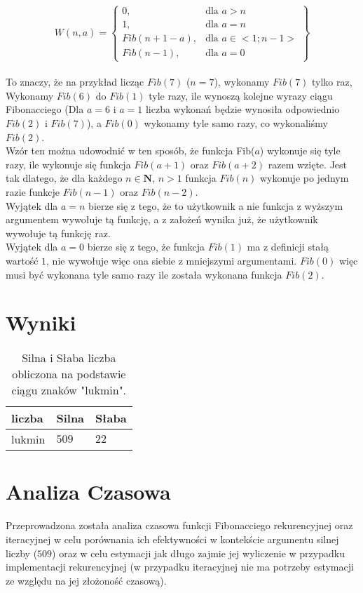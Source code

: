 \documentclass{article}
\begin{document}
\[
W(n, a) = \left\{\begin{array}{lr}
    0, & \text{dla } a > n\\
    1, & \text{dla } a = n\\
    Fib(n + 1 - a), & \text{dla } a \in <1; n-1>\\
    Fib(n - 1), & \text{dla } a = 0
    \end{array}\right\}
\]\\
To znaczy, że na przykład licząc $Fib(7)$ ($n = 7$), wykonamy $Fib(7)$ tylko raz, Wykonamy $Fib(6)$ do $Fib(1)$ tyle razy, ile wynoszą kolejne wyrazy ciągu Fibonacciego (Dla $a = 6$ i $a = 1$ liczba wykonań będzie wynosiła odpowiednio $Fib(2)$ i $Fib(7)$), a $Fib(0)$ wykonamy tyle samo razy, co wykonaliśmy $Fib(2)$.\vspace{2ex}\\

Wzór ten można udowodnić w ten sposób, że funkcja Fib($a$) wykonuje się tyle razy, ile wykonuje się funkcja $Fib(a+1)$ oraz $Fib(a+2)$ razem wzięte. Jest tak dlatego, że dla każdego $n \in \mathbf{N}$, $n > 1$ funkcja $Fib(n)$ wykonuje po jednym razie funkcje $Fib(n-1)$ oraz $Fib(n-2)$.\vspace{1ex}\\
Wyjątek dla $a = n$ bierze się z tego, że to użytkownik a nie funkcja z wyższym argumentem wywołuje tą funkcję, a z założeń wynika już, że użytkownik wywołuje tą funkcję raz.\\
Wyjątek dla $a = 0$ bierze się z tego, że funkcja $Fib(1)$ ma z definicji stałą wartość $1$, nie wywołuje więc ona siebie z mniejszymi argumentami. $Fib(0)$ więc musi być wykonana tyle samo razy ile została wykonana funkcja $Fib(2)$.

\section{Wyniki}

\begin{table}[h]
\centering
\begin{tabular}{|l|l|l|}\hline
liczba & Silna & Słaba \\\hline
 lukmin & $509$ & $22$\\\hline
\end{tabular}
\caption{\label{tab:h2}Silna i Słaba liczba obliczona na podstawie ciągu znaków "lukmin".}
\end{table}

\section{Analiza Czasowa}
Przeprowadzona została analiza czasowa funkcji Fibonacciego rekurencyjnej oraz iteracyjnej w celu porównania ich efektywności w kontekście argumentu silnej liczby ($509$) oraz w celu estymacji jak długo zajmie jej wyliczenie w przypadku implementacji rekurencyjnej (w przypadku iteracyjnej nie ma potrzeby estymacji ze względu na jej złożoność czasową).\\
\end{document}
